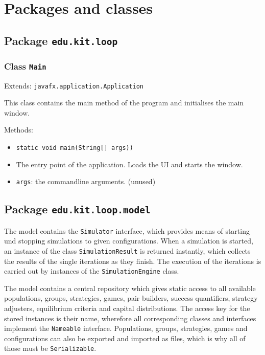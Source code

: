 \documentclass[parskip=full,11pt]{scrartcl}
\begin{document}
\section{Packages and classes}

\subsection{Package \texttt{edu.kit.loop}}

\subsubsection{Class \texttt{Main}}
Extends: \texttt{javafx.application.Application}

This class contains the main method of the program and initialises the main window.

Methods:
\begin{itemize}\itemsep -10pt
\item \texttt{static void main(String[] args))}
\item[] The entry point of the application. Loads the UI and starts the window.
\item[] \texttt{args}: the commandline arguments. (unused)
\end{itemize}

\subsection{Package \texttt{edu.kit.loop.model}}
The model contains the \texttt{Simulator} interface, which provides means of starting und stopping simulations to given configurations. When a simulation is started, an instance of the class \texttt{SimulationResult} is returned instantly, which collects the results of the single iterations as they finish. The execution of the iterations is carried out by instances of the \texttt{SimulationEngine} class.

The model contains a central repository which gives static access to all available populations, groups, strategies, games, pair builders, success quantifiers, strategy adjusters, equilibrium criteria and capital distributions. The access key for the stored instances is their name, wherefore all corresponding classes and interfaces implement the \texttt{Nameable} interface. Populations, groups, strategies, games and configurations can also be exported and imported as files, which is why all of those must be \texttt{Serializable}.
\end{document}
